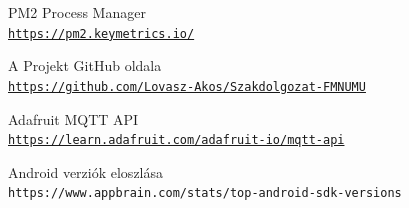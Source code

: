 \documentclass[]{thesis-ekf}
\theoremstyle{definition}
\theoremstyle{remark}
\begin{document}
\begin{thebibliography}{2}
PM2 Process Manager
\\\texttt{\url{https://pm2.keymetrics.io/}}

A Projekt GitHub oldala
\\\texttt{\url{https://github.com/Lovasz-Akos/Szakdolgozat-FMNUMU}}

Adafruit MQTT API
\\\texttt{\url{https://learn.adafruit.com/adafruit-io/mqtt-api}}

Android verziók eloszlása
\\\texttt{https://www.appbrain.com/stats/top-android-sdk-versions}
\end{thebibliography}

%
\end{document}
